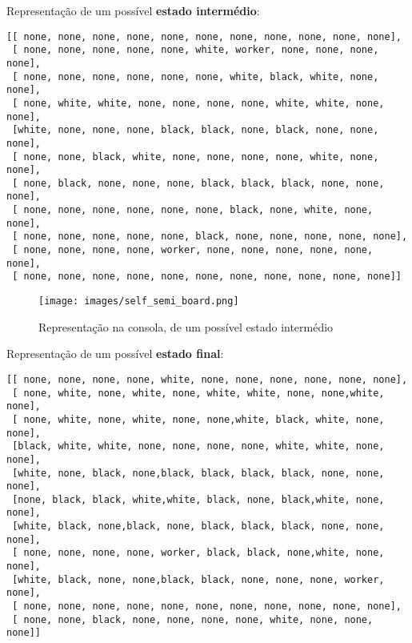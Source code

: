 \documentclass[a4paper]{article}
\begin{document}
\clearpage

Representação de um possível \textbf{estado intermédio}:\newline

\begin{small}
\begin{lstlisting}
[[ none, none, none, none, none, none, none, none, none, none, none],
 [ none, none, none, none, none, white, worker, none, none, none, none],
 [ none, none, none, none, none, none, white, black, white, none, none],
 [ none, white, white, none, none, none, none, white, white, none, none],
 [white, none, none, none, black, black, none, black, none, none, none],
 [ none, none, black, white, none, none, none, none, white, none, none],
 [ none, black, none, none, none, black, black, black, none, none, none],
 [ none, none, none, none, none, none, black, none, white, none, none],
 [ none, none, none, none, none, black, none, none, none, none, none],
 [ none, none, none, none, worker, none, none, none, none, none, none],
 [ none, none, none, none, none, none, none, none, none, none, none]]
\end{lstlisting}
\end{small}

\begin{figure}[h!]
\begin{center}
	\texttt{[image: images/self\_semi\_board.png]}
	\caption{Representação na consola, de um possível estado intermédio}
	\label{Figura 6}
\end{center}
\end{figure}

\clearpage
Representação de um possível \textbf{estado final}:\newline

\begin{small}
\begin{lstlisting}
[[ none, none, none, none, white, none, none, none, none, none, none],
 [ none, white, none, white, none, white, white, none, none,white, none],
 [ none, white, none, white, none, none,white, black, white, none, none],
 [black, white, white, none, none, none, none, white, white, none, none],
 [white, none, black, none,black, black, black, black, none, none, none],
 [none, black, black, white,white, black, none, black,white, none, none],
 [white, black, none,black, none, black, black, black, none, none, none],
 [ none, none, none, none, worker, black, black, none,white, none, none],
 [white, black, none, none,black, black, none, none, none, worker, none],
 [ none, none, none, none, none, none, none, none, none, none, none],
 [ none, none, black, none, none, none, none, white, none, none, none]]
\end{lstlisting}
\end{small}
\end{document}
